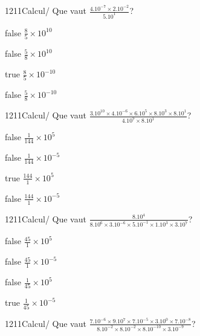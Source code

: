             \begin{question}{1211}{Calcul}{}{/}
                Que vaut $\frac{4.10^{-7}\times 2.10^{-2}}{5.10^{1}}$?
            \end{question}
            \begin{reponses}
                \item[false] $\frac{8}{5}\times 10^{10}$
                \item[false] $\frac{5}{8}\times 10^{10}$
                \item[true] $\frac{8}{5}\times 10^{-10}$
                \item[false] $\frac{5}{8}\times 10^{-10}$
            \end{reponses}
            \begin{question}{1211}{Calcul}{}{/}
                Que vaut $\frac{3.10^{10}\times 4.10^{-6}\times 6.10^{5}\times 8.10^{3}\times 8.10^{1}}{4.10^{7}\times 8.10^{1}}$?
            \end{question}
            \begin{reponses}
                \item[false] $\frac{1}{144}\times 10^{5}$
                \item[false] $\frac{1}{144}\times 10^{-5}$
                \item[true] $\frac{144}{1}\times 10^{5}$
                \item[false] $\frac{144}{1}\times 10^{-5}$
            \end{reponses}
            \begin{question}{1211}{Calcul}{}{/}
                Que vaut $\frac{8.10^{4}}{8.10^{6}\times 3.10^{-6}\times 5.10^{-1}\times 1.10^{3}\times 3.10^{7}}$?
            \end{question}
            \begin{reponses}
                \item[false] $\frac{45}{1}\times 10^{5}$
                \item[false] $\frac{45}{1}\times 10^{-5}$
                \item[false] $\frac{1}{45}\times 10^{5}$
                \item[true] $\frac{1}{45}\times 10^{-5}$
            \end{reponses}
            \begin{question}{1211}{Calcul}{}{/}
                Que vaut $\frac{7.10^{-6}\times 9.10^{7}\times 7.10^{-5}\times 3.10^{0}\times 7.10^{-8}}{8.10^{-2}\times 8.10^{-2}\times 8.10^{-10}\times 3.10^{-9}}$?
            \end{question}
